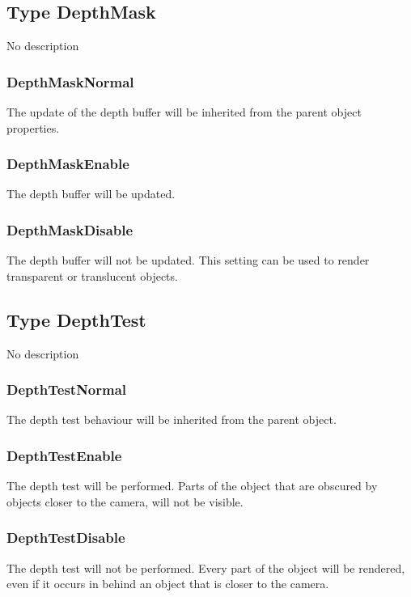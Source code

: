\subsection{Type DepthMask \label{T:DepthMask}}
No description

\subsubsection{DepthMaskNormal \label{T:DepthMask|DepthMaskNormal}}
The update of the depth buffer will be inherited from the parent object properties.

\subsubsection{DepthMaskEnable \label{T:DepthMask|DepthMaskEnable}}
The depth buffer will be updated.

\subsubsection{DepthMaskDisable \label{T:DepthMask|DepthMaskDisable}}
The depth buffer will not be updated. This setting can be used to render transparent or translucent objects.

\subsection{Type DepthTest \label{T:DepthTest}}
No description

\subsubsection{DepthTestNormal \label{T:DepthTest|DepthTestNormal}}
The depth test behaviour will be inherited from the parent object.

\subsubsection{DepthTestEnable \label{T:DepthTest|DepthTestEnable}}
The depth test will be performed. Parts of the object that are obscured by objects closer to the camera, will not be visible.

\subsubsection{DepthTestDisable \label{T:DepthTest|DepthTestDisable}}
The depth test will not be performed. Every part of the object will be rendered, even if it occurs in behind an object that is closer to the camera.

